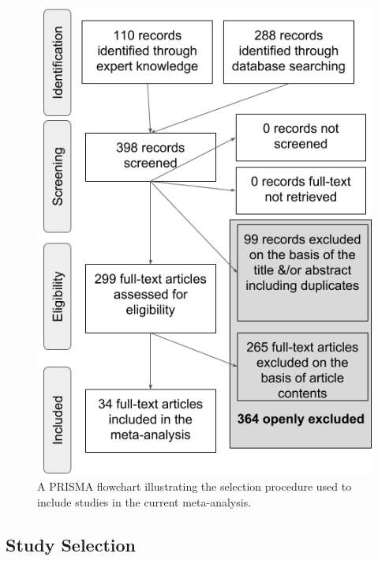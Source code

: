 \documentclass[man]{apa6}
\theoremstyle{definition}
\theoremstyle{definition}
\theoremstyle{definition}
\theoremstyle{remark}
\begin{document}
\begin{figure}
\centering
\includegraphics{figures/Figure_1_PRISMA_MA_Mispronunciation.png}
\caption{\label{fig:PRISMA-image}A PRISMA flowchart illustrating the
selection procedure used to include studies in the current
meta-analysis.}
\end{figure}

\subsection{Study Selection}\label{study-selection}
\end{document}
